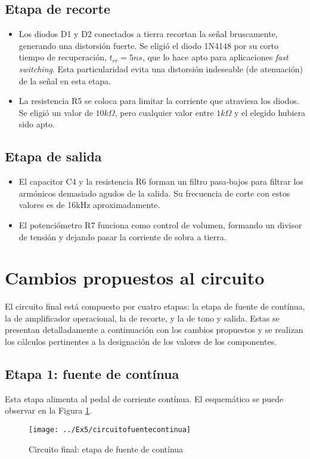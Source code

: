 \subsection{Etapa de recorte}
\begin{itemize}
    \item Los diodos D1 y D2 conectados a tierra recortan la señal bruscamente, generando una distorsión fuerte. Se eligió el diodo 1N4148 por su corto tiempo de recuperación, $t_{rr}=5ns$, que lo hace apto para aplicaciones \emph{fast switching}. Esta particularidad evita una distorsión indeseable (de atenuación) de la señal en esta etapa. 
    \item La resistencia R5 se coloca para limitar la corriente que atraviesa los diodos. Se eligió un valor de $10k\Omega$, pero cualquier valor entre $1k\Omega$ y el elegido hubiera sido apto.
\end{itemize}
\subsection{Etapa de salida}
\begin{itemize}
    \item El capacitor C4 y la resistencia R6 forman un filtro pasa-bajos para filtrar los armónicos demasiado agudos de la salida. Su frecuencia de corte con estos valores es de 16kHz aproximadamente.
    \item El potenciómetro R7 funciona como control de volumen, formando un divisor de tensión y dejando pasar la corriente de sobra a tierra.
\end{itemize}
\section{Cambios propuestos al circuito}
El circuito final está compuesto por cuatro etapas: la etapa de fuente de contínua, la de amplificador operacional, la de recorte, y la de tono y salida. Estas se presentan detalladamente a continuación con los cambios propuestos y se realizan los cálculos pertinentes a la designación de los valores de los componentes.
\subsection{Etapa 1: fuente de contínua}
Esta etapa alimenta al pedal de corriente contínua. El esquemático se puede observar en la Figura \ref{fig:circuitofuentecontinua}.
\begin{figure}[h]
    \centering
    \texttt{[image: ../Ex5/circuitofuentecontinua]}
    \caption{Circuito final: etapa de fuente de contínua}
    \label{fig:circuitofuentecontinua}
\end{figure}
